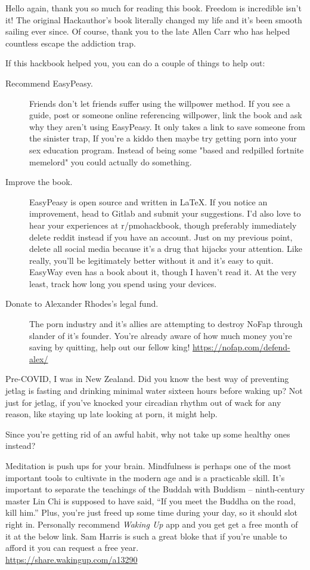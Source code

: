 \documentclass[easypeasy.tex]{subfiles}
\begin{document}
Hello again, thank you so much for reading this book. Freedom is incredible isn't it! The original Hackauthor's book literally changed my life and it's been smooth sailing ever since. Of course, thank you to the late Allen Carr who has helped countless escape the addiction trap.

If this hackbook helped you, you can do a couple of things to help out:
  \begin{description}
    \item [Recommend EasyPeasy.] Friends don't let friends suffer using the willpower method. If you see a guide, post or someone online referencing willpower, link the book and ask why they aren't using EasyPeasy. It only takes a link to save someone from the sinister trap, If you're a kiddo then maybe try getting porn into your sex education program. Instead of being some "based and redpilled fortnite memelord" you could actually do something.

  \item [Improve the book.] EasyPeasy is open source and written in LaTeX. If you notice an improvement, head to Gitlab and submit your suggestions. I'd also love to hear your experiences at r/pmohackbook, though preferably immediately delete reddit instead if you have an account. Just on my previous point, delete all social media because it's a drug that hijacks your attention. Like really, you'll be legitimately better without it and it's easy to quit. EasyWay even has a book about it, though I haven't read it. At the very least, track how long you spend using your devices.

  \item [Donate to Alexander Rhodes's legal fund.] The porn industry and it's allies are attempting to destroy NoFap through slander of it's founder. You're already aware of how much money you're saving by quitting, help out our fellow king! \url{https://nofap.com/defend-alex/}
  \end{description}

Pre-COVID, I was in New Zealand. Did you know the best way of preventing jetlag is fasting and drinking minimal water sixteen hours before waking up? Not just for jetlag, if you've knocked your circadian rhythm out of wack for any reason, like staying up late looking at porn, it might help.

Since you're getting rid of an awful habit, why not take up some healthy ones instead?

Meditation is push ups for your brain. Mindfulness is perhaps one of the most important tools to cultivate in the modern age and is a practicable skill. It's important to separate the teachings of the Buddah with Buddism -- ninth-century master Lin Chi is supposed to have said, “If you meet the Buddha on the road, kill him.” Plus, you're just freed up some time during your day, so it should slot right in. Personally recommend \textit{Waking Up} app and you get get a free month of it at the below link. Sam Harris is such a great bloke that if you're unable to afford it you can request a free year. \\ \url{https://share.wakingup.com/a13290}
\end{document}
